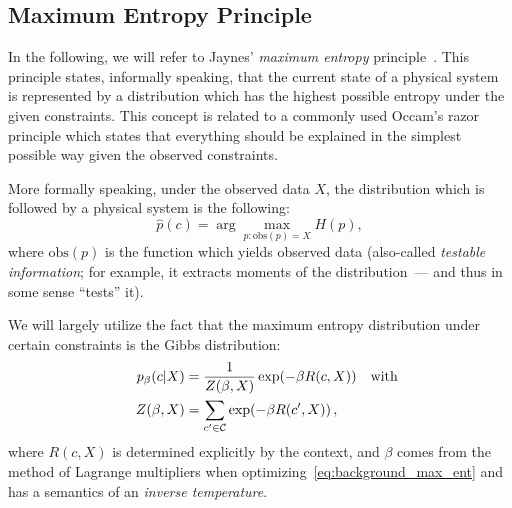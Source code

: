 \subsection{Maximum Entropy Principle}
\label{sec:background_max_entropy}

In the following, we will refer to Jaynes' \textit{maximum entropy}
principle~\citep{Jaynes57a,Jaynes57b}. This principle states, informally
speaking, that the current state of a physical system is represented by a
distribution which has the highest possible entropy under the given constraints.
This concept is related to a commonly used Occam's razor principle which states
that everything should be explained in the simplest possible way given the
observed constraints.

More formally speaking, under the observed data $X$, the distribution which is
followed by a physical system is the following:
\begin{equation}\label{eq:background_max_ent}
  \hat p(c) = \arg \max_{p \colon \mathrm{obs}(p) = X} H(p),
\end{equation}
where $\mathrm{obs}(p)$ is the function which yields observed data (also-called
\textit{testable information}; for example, it extracts moments of 
the distribution~--- and thus in some sense ``tests'' it).

We will largely utilize the fact that the maximum entropy distribution under certain
constraints is the Gibbs distribution:
\begin{align}
  p_\beta(c|X) &=\frac{1}{Z(\beta, X)} \exp(-\beta R(c, X))
    \quad\text{with} \notag \\
  \quad Z(\beta, X) &= \sum_{c^\prime\in {\cal C}} \exp(-\beta R(c^\prime, X))\,,
\end{align}
where $R(c, X)$ is determined explicitly by the context, and $\beta$ comes from
the method of Lagrange multipliers when optimizing~\eqref{eq:background_max_ent}
and has a semantics of an \textit{inverse temperature}.


